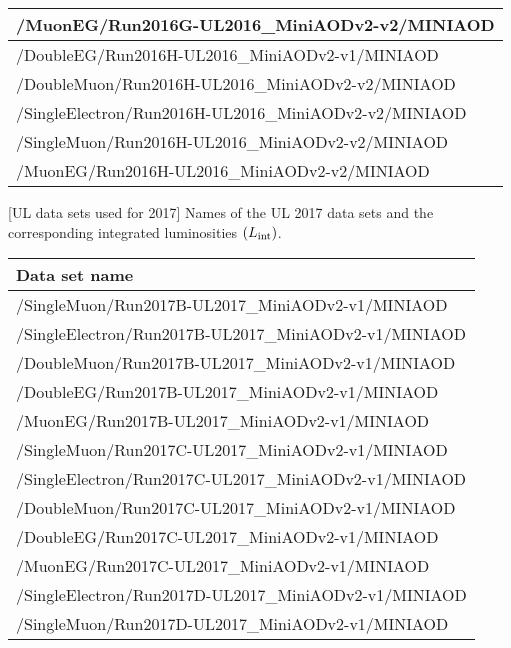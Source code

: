 \begin{table}[h]
\begin{tabular}{l}
        /MuonEG/Run2016G-UL2016\_MiniAODv2-v2/MINIAOD	\\
        \hline
        /DoubleEG/Run2016H-UL2016\_MiniAODv2-v1/MINIAOD \\
        /DoubleMuon/Run2016H-UL2016\_MiniAODv2-v2/MINIAOD	\\
        /SingleElectron/Run2016H-UL2016\_MiniAODv2-v2/MINIAOD	\\
        /SingleMuon/Run2016H-UL2016\_MiniAODv2-v2/MINIAOD	\\
        /MuonEG/Run2016H-UL2016\_MiniAODv2-v2/MINIAOD	\\
        \hline
		\end{tabular}
	\label{table:2016_dataSamples_dilep}
\end{table}
\begin{table}[h]
    \small
    \centering
        [UL data sets used for 2017] %
        {Names of the UL 2017 data sets and the corresponding integrated luminosities $\left( L_\text{int} \right)$.} %
		\begin{tabular}{l}
		\hline      
        Data set name \\
        \hline
        /SingleMuon/Run2017B-UL2017\_MiniAODv2-v1/MINIAOD    \\ %
        /SingleElectron/Run2017B-UL2017\_MiniAODv2-v1/MINIAOD   	\\
        /DoubleMuon/Run2017B-UL2017\_MiniAODv2-v1/MINIAOD   	\\
        /DoubleEG/Run2017B-UL2017\_MiniAODv2-v1/MINIAOD 	\\
        /MuonEG/Run2017B-UL2017\_MiniAODv2-v1/MINIAOD   	\\
        \hline
        /SingleMuon/Run2017C-UL2017\_MiniAODv2-v1/MINIAOD    \\ %
        /SingleElectron/Run2017C-UL2017\_MiniAODv2-v1/MINIAOD    \\
        /DoubleMuon/Run2017C-UL2017\_MiniAODv2-v1/MINIAOD    \\
        /DoubleEG/Run2017C-UL2017\_MiniAODv2-v1/MINIAOD  \\
        /MuonEG/Run2017C-UL2017\_MiniAODv2-v1/MINIAOD    \\
        \hline
        /SingleElectron/Run2017D-UL2017\_MiniAODv2-v1/MINIAOD    \\ %
        /SingleMuon/Run2017D-UL2017\_MiniAODv2-v1/MINIAOD    \\

\end{tabular}
\end{table}
